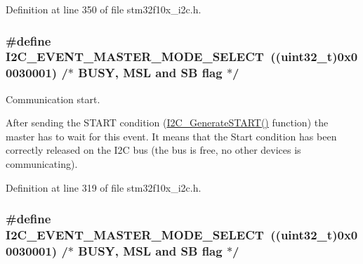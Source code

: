 Definition at line 350 of file stm32f10x\+\_\+i2c.\+h.

\subsubsection[{\texorpdfstring{I2\+C\+\_\+\+E\+V\+E\+N\+T\+\_\+\+M\+A\+S\+T\+E\+R\+\_\+\+M\+O\+D\+E\+\_\+\+S\+E\+L\+E\+CT}{I2C_EVENT_MASTER_MODE_SELECT}}]{\setlength{\rightskip}{0pt plus 5cm}\#define I2\+C\+\_\+\+E\+V\+E\+N\+T\+\_\+\+M\+A\+S\+T\+E\+R\+\_\+\+M\+O\+D\+E\+\_\+\+S\+E\+L\+E\+CT~(({\bf uint32\+\_\+t})0x00030001)  /$\ast$ B\+U\+S\+Y, M\+S\+L and S\+B flag $\ast$/}\hypertarget{group___i2_c___events_gaeef8c22ac035122b06e31b360ac7aeb3}{}\label{group___i2_c___events_gaeef8c22ac035122b06e31b360ac7aeb3}


Communication start. 

After sending the S\+T\+A\+RT condition (\hyperlink{group___i2_c___private___functions_ga36c522b471588be9779c878222ccb20f}{I2\+C\+\_\+\+Generate\+S\+T\+A\+R\+T()} function) the master has to wait for this event. It means that the Start condition has been correctly released on the I2C bus (the bus is free, no other devices is communicating). 

Definition at line 319 of file stm32f10x\+\_\+i2c.\+h.

\subsubsection[{\texorpdfstring{I2\+C\+\_\+\+E\+V\+E\+N\+T\+\_\+\+M\+A\+S\+T\+E\+R\+\_\+\+M\+O\+D\+E\+\_\+\+S\+E\+L\+E\+CT}{I2C_EVENT_MASTER_MODE_SELECT}}]{\setlength{\rightskip}{0pt plus 5cm}\#define I2\+C\+\_\+\+E\+V\+E\+N\+T\+\_\+\+M\+A\+S\+T\+E\+R\+\_\+\+M\+O\+D\+E\+\_\+\+S\+E\+L\+E\+CT~(({\bf uint32\+\_\+t})0x00030001)  /$\ast$ B\+U\+S\+Y, M\+S\+L and S\+B flag $\ast$/}\hypertarget{group___i2_c___events_gaeef8c22ac035122b06e31b360ac7aeb3}{}\label{group___i2_c___events_gaeef8c22ac035122b06e31b360ac7aeb3}


